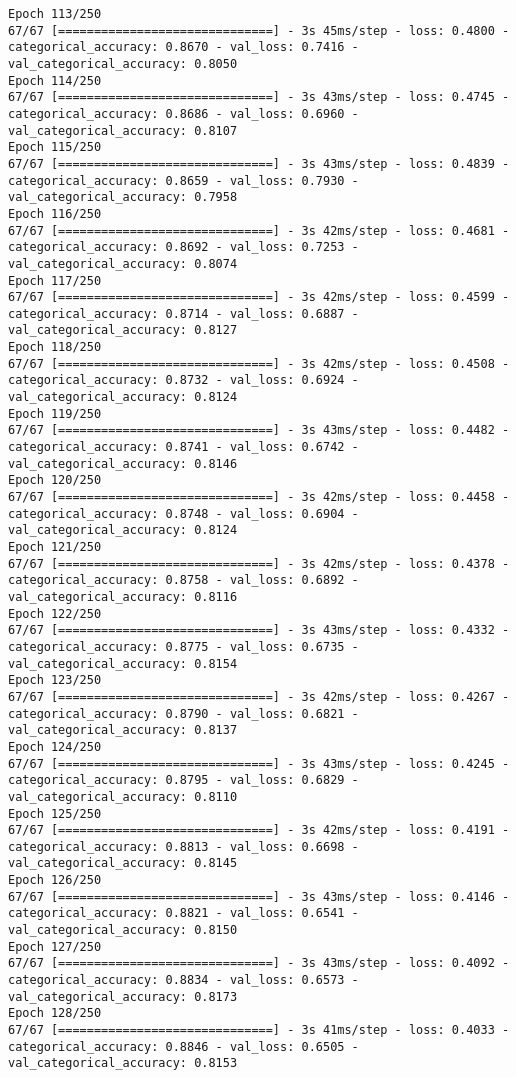 \begin{lstlisting}
Epoch 113/250
67/67 [==============================] - 3s 45ms/step - loss: 0.4800 - categorical_accuracy: 0.8670 - val_loss: 0.7416 - val_categorical_accuracy: 0.8050
Epoch 114/250
67/67 [==============================] - 3s 43ms/step - loss: 0.4745 - categorical_accuracy: 0.8686 - val_loss: 0.6960 - val_categorical_accuracy: 0.8107
Epoch 115/250
67/67 [==============================] - 3s 43ms/step - loss: 0.4839 - categorical_accuracy: 0.8659 - val_loss: 0.7930 - val_categorical_accuracy: 0.7958
Epoch 116/250
67/67 [==============================] - 3s 42ms/step - loss: 0.4681 - categorical_accuracy: 0.8692 - val_loss: 0.7253 - val_categorical_accuracy: 0.8074
Epoch 117/250
67/67 [==============================] - 3s 42ms/step - loss: 0.4599 - categorical_accuracy: 0.8714 - val_loss: 0.6887 - val_categorical_accuracy: 0.8127
Epoch 118/250
67/67 [==============================] - 3s 42ms/step - loss: 0.4508 - categorical_accuracy: 0.8732 - val_loss: 0.6924 - val_categorical_accuracy: 0.8124
Epoch 119/250
67/67 [==============================] - 3s 43ms/step - loss: 0.4482 - categorical_accuracy: 0.8741 - val_loss: 0.6742 - val_categorical_accuracy: 0.8146
Epoch 120/250
67/67 [==============================] - 3s 42ms/step - loss: 0.4458 - categorical_accuracy: 0.8748 - val_loss: 0.6904 - val_categorical_accuracy: 0.8124
Epoch 121/250
67/67 [==============================] - 3s 42ms/step - loss: 0.4378 - categorical_accuracy: 0.8758 - val_loss: 0.6892 - val_categorical_accuracy: 0.8116
Epoch 122/250
67/67 [==============================] - 3s 43ms/step - loss: 0.4332 - categorical_accuracy: 0.8775 - val_loss: 0.6735 - val_categorical_accuracy: 0.8154
Epoch 123/250
67/67 [==============================] - 3s 42ms/step - loss: 0.4267 - categorical_accuracy: 0.8790 - val_loss: 0.6821 - val_categorical_accuracy: 0.8137
Epoch 124/250
67/67 [==============================] - 3s 43ms/step - loss: 0.4245 - categorical_accuracy: 0.8795 - val_loss: 0.6829 - val_categorical_accuracy: 0.8110
Epoch 125/250
67/67 [==============================] - 3s 42ms/step - loss: 0.4191 - categorical_accuracy: 0.8813 - val_loss: 0.6698 - val_categorical_accuracy: 0.8145
Epoch 126/250
67/67 [==============================] - 3s 43ms/step - loss: 0.4146 - categorical_accuracy: 0.8821 - val_loss: 0.6541 - val_categorical_accuracy: 0.8150
Epoch 127/250
67/67 [==============================] - 3s 43ms/step - loss: 0.4092 - categorical_accuracy: 0.8834 - val_loss: 0.6573 - val_categorical_accuracy: 0.8173
Epoch 128/250
67/67 [==============================] - 3s 41ms/step - loss: 0.4033 - categorical_accuracy: 0.8846 - val_loss: 0.6505 - val_categorical_accuracy: 0.8153

\end{lstlisting}
